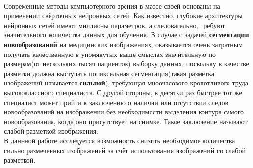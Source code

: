 \\
\indent Современные методы компьютерного зрения в массе своей основаны на применении свёрточных нейронных сетей. Как известно, глубокие архитектуры нейронных сетей имеют миллионы параметров, а следовательно, требуют значительного количества данных для обучения. В случае с задачей {\bf сегментации  новообразований} на медицинских изображениях, оказывается очень затратным получать качественную в упомянутых выше смыслах значительную по размерам(от нескольких тысяч пациентов) выборку данных, поскольку в качестве разметки должна выступать попиксельная сегментация(такая разметка изображений называется {\bf сильной}), требующая мноочасового кропотливого труда высококлассного специалиста. С другой стороны, в десятки раз быстрее тот же специалист может прийти к заключению о наличии или отсутствии следов новообразований на изображении без необходимости выделения контура самого новообразования, когда оно присутствует на снимке. Такое заключение называют слабой разметкой изображения. 
\\
\indent В даннной работе исследуется возможность снизить необходимое количества сильно размеченных изображений за счёт использования изображений со слабой разметкой.
